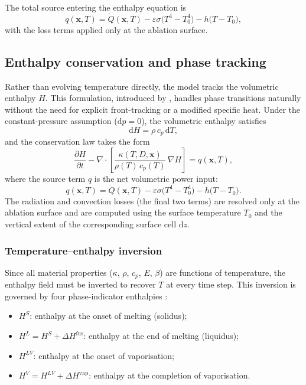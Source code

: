 \documentclass[12pt, a4paper]{article}
\newcommand{\pd}[2]{\dfrac{\partial #1}{\partial #2}}
\newcommand{\vv}[1]{\bm{#1}}
\begin{document}
\noindent The total source entering the enthalpy equation is
\begin{equation}
    q(\vv{x},T) = \dot{Q}(\vv{x},T)
                 - \varepsilon\sigma\bigl(T^4 - T_0^4\bigr)
                 - h\bigl(T - T_0\bigr),
    \label{eq:source}
\end{equation}
with the loss terms applied only at the ablation surface.

\subsection{Enthalpy conservation and phase tracking}
\label{sec:heat}

Rather than evolving temperature directly, the model tracks the volumetric
enthalpy $H$.  This formulation, introduced by \citet{alexiades2010enthalpy},
handles phase transitions naturally without the need for explicit front-tracking
or a modified specific heat.  Under the constant-pressure assumption ($\mathrm{d}p
= 0$), the volumetric enthalpy satisfies
\begin{equation}
    \mathrm{d}H = \rho\,c_p\,\mathrm{d}T,
    \label{eq:dH}
\end{equation}
and the conservation law takes the form
\begin{equation}
    \pd{H}{t}
    - \nabla\cdot\!\left[\frac{\kappa(T,D,\vv{x})}{\rho(T)\,c_p(T)}\,\nabla H\right]
    = q(\vv{x}, T),
    \label{eq:enthalpy_pde}
\end{equation}
where the source term $q$ is the net volumetric power input:
\begin{equation}
    q(\vv{x}, T) = \dot{Q}(\vv{x},T)
                   - \varepsilon\sigma\bigl(T^4 - T_0^4\bigr)
                   - h\bigl(T - T_0\bigr).
    \label{eq:source_q}
\end{equation}
The radiation and convection losses (the final two terms) are resolved only at
the ablation surface and are computed using the surface temperature $T_0$ and
the vertical extent of the corresponding surface cell $\mathrm{d}z$.

\subsubsection{Temperature--enthalpy inversion}

Since all material properties ($\kappa$, $\rho$, $c_p$, $E$, $\beta$) are
functions of temperature, the enthalpy field must be inverted to recover $T$
at every time step.  This inversion is governed by four phase-indicator
enthalpies \citep{alexiades2010enthalpy}:
\begin{itemize}[noitemsep]
    \item $H^S$: enthalpy at the onset of melting (solidus);
    \item $H^L = H^S + \Delta H^\mathrm{fus}$: enthalpy at the end of melting
          (liquidus);
    \item $H^{LV}$: enthalpy at the onset of vaporisation;
    \item $H^V = H^{LV} + \Delta H^\mathrm{vap}$: enthalpy at the completion
          of vaporisation.
\end{itemize}
\end{document}

